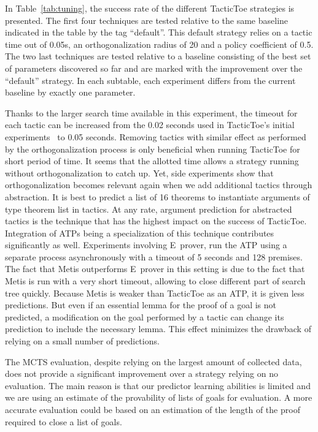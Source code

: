 \documentclass[runningheads,a4paper,draft]{svjour3}
\def\eprover{\textsf{E~prover}\xspace}
\def\metis{\textsf{Metis}\xspace}
\def\tactictoe{\textsf{TacticToe}\xspace}
\begin{document}
In Table~\ref{tab:tuning}, the success rate of the different \tactictoe
strategies is presented.
The first four techniques are tested relative to the same baseline indicated in
the table by the tag ``default''.  This default strategy relies on a tactic
time out of 0.05s, an orthogonalization radius of 20 and a policy coefficient of
0.5.
The two last techniques are tested relative
to a baseline consisting of the best set of parameters discovered so far and
are marked with the improvement over the ``default'' strategy.
In each subtable, each experiment differs from the current baseline by exactly
one parameter.

Thanks to the larger search time available in this experiment, the timeout for
each tactic can be increased from the 0.02 seconds used in \tactictoe's initial
experiments~\cite{tgckju-lpar17} to 0.05
seconds. Removing tactics with similar effect as performed by the
orthogonalization process is only beneficial when running \tactictoe for short
period of time. It seems that the allotted time allows a strategy
running without orthogonalization to catch up. Yet, side experiments show
that orthogonalization becomes relevant again when we add additional
tactics through abstraction.
It is best to predict a list of 16 theorems to instantiate arguments of type
theorem list in tactics. At any rate, argument prediction for abstracted
tactics is the technique that has the highest impact on the success of
\tactictoe. Integration of ATPs being a specialization of this technique
contributes significantly as well. Experiments involving \eprover, run the ATP
using a separate process asynchronously with a timeout of 5 seconds and 128 premises.
The fact that \metis outperforms \eprover in this setting is due to the fact
that \metis is run with a very short timeout, allowing to close different part
of search tree quickly. Because \metis is weaker than \tactictoe as an ATP, it
is given less predictions. But even if an essential lemma for the proof of a
goal is not predicted, a modification on the goal performed by a tactic can
change its prediction to include the necessary lemma.
This effect minimizes the drawback of relying on a small number of predictions.

The MCTS evaluation, despite relying on the largest amount of collected data,
does not provide a significant improvement over a strategy relying on no
evaluation. The main reason is that our predictor learning abilities is
limited and we are using an estimate of the provability of lists of goals for
evaluation. A more accurate evaluation could be based on an estimation of the
length of the proof required to close a list of goals.
\end{document}
